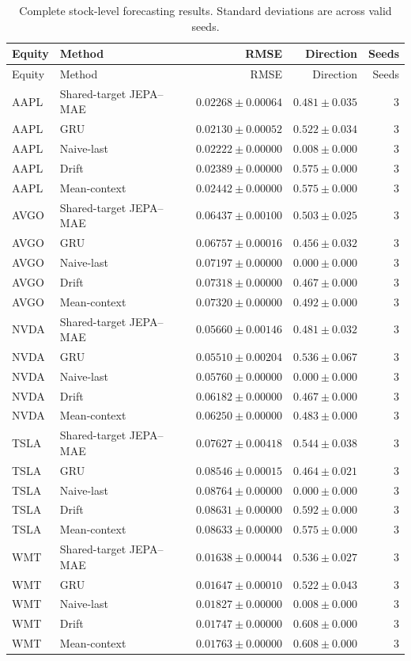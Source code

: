 \begin{longtable}{llrrr}
\caption{Complete stock-level forecasting results. Standard deviations are across valid seeds.}\label{tab:appendix_stock_metrics}\\
\toprule
Equity & Method & RMSE & Direction & Seeds \\
\midrule
\endfirsthead
\toprule
Equity & Method & RMSE & Direction & Seeds \\
\midrule
\endhead
AAPL & Shared-target JEPA--MAE & $0.02268 \pm 0.00064$ & $0.481 \pm 0.035$ & 3 \\
AAPL & GRU & $0.02130 \pm 0.00052$ & $0.522 \pm 0.034$ & 3 \\
AAPL & Naive-last & $0.02222 \pm 0.00000$ & $0.008 \pm 0.000$ & 3 \\
AAPL & Drift & $0.02389 \pm 0.00000$ & $0.575 \pm 0.000$ & 3 \\
AAPL & Mean-context & $0.02442 \pm 0.00000$ & $0.575 \pm 0.000$ & 3 \\
AVGO & Shared-target JEPA--MAE & $0.06437 \pm 0.00100$ & $0.503 \pm 0.025$ & 3 \\
AVGO & GRU & $0.06757 \pm 0.00016$ & $0.456 \pm 0.032$ & 3 \\
AVGO & Naive-last & $0.07197 \pm 0.00000$ & $0.000 \pm 0.000$ & 3 \\
AVGO & Drift & $0.07318 \pm 0.00000$ & $0.467 \pm 0.000$ & 3 \\
AVGO & Mean-context & $0.07320 \pm 0.00000$ & $0.492 \pm 0.000$ & 3 \\
NVDA & Shared-target JEPA--MAE & $0.05660 \pm 0.00146$ & $0.481 \pm 0.032$ & 3 \\
NVDA & GRU & $0.05510 \pm 0.00204$ & $0.536 \pm 0.067$ & 3 \\
NVDA & Naive-last & $0.05760 \pm 0.00000$ & $0.000 \pm 0.000$ & 3 \\
NVDA & Drift & $0.06182 \pm 0.00000$ & $0.467 \pm 0.000$ & 3 \\
NVDA & Mean-context & $0.06250 \pm 0.00000$ & $0.483 \pm 0.000$ & 3 \\
TSLA & Shared-target JEPA--MAE & $0.07627 \pm 0.00418$ & $0.544 \pm 0.038$ & 3 \\
TSLA & GRU & $0.08546 \pm 0.00015$ & $0.464 \pm 0.021$ & 3 \\
TSLA & Naive-last & $0.08764 \pm 0.00000$ & $0.000 \pm 0.000$ & 3 \\
TSLA & Drift & $0.08631 \pm 0.00000$ & $0.592 \pm 0.000$ & 3 \\
TSLA & Mean-context & $0.08633 \pm 0.00000$ & $0.575 \pm 0.000$ & 3 \\
WMT & Shared-target JEPA--MAE & $0.01638 \pm 0.00044$ & $0.536 \pm 0.027$ & 3 \\
WMT & GRU & $0.01647 \pm 0.00010$ & $0.522 \pm 0.043$ & 3 \\
WMT & Naive-last & $0.01827 \pm 0.00000$ & $0.008 \pm 0.000$ & 3 \\
WMT & Drift & $0.01747 \pm 0.00000$ & $0.608 \pm 0.000$ & 3 \\
WMT & Mean-context & $0.01763 \pm 0.00000$ & $0.608 \pm 0.000$ & 3 \\
\bottomrule
\end{longtable}
